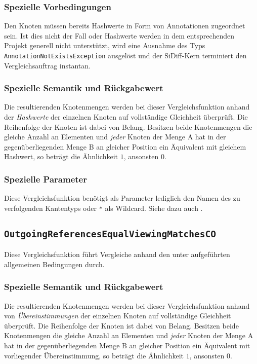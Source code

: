 \subsubsection*{Spezielle Vorbedingungen}
Den Knoten müssen bereits Hashwerte in Form von Annotationen zugeordnet sein. Ist dies nicht der Fall oder Hashwerte werden in dem entsprechenden Projekt generell nicht unterstützt, wird eine Ausnahme des Typs \texttt{AnnotationNotExistsException} ausgelöst und der SiDiff-Kern terminiert den Vergleichsauftrag instantan.

\subsubsection*{Spezielle Semantik und Rückgabewert}
Die resultierenden Knotenmengen werden bei dieser Vergleichsfunktion anhand der \emph{Hashwerte} der einzelnen Knoten auf vollständige Gleichheit überprüft. Die Reihenfolge der Knoten ist dabei von Belang. Besitzen beide Knotenmengen die gleiche Anzahl an Elementen und \emph{jeder} Knoten der Menge A hat in der gegenüberliegenden Menge B an gleicher Position ein Äquivalent mit gleichem Hashwert, so beträgt die Ähnlichkeit $1$, ansonsten $0$.

\subsubsection*{Spezielle Parameter}
Diese Vergleichsfunktion benötigt als Parameter lediglich den Namen des zu verfolgenden Kantentyps oder \texttt{*} als Wildcard. Siehe dazu auch .


%
%
\subsection{\texttt{OutgoingReferencesEqualViewingMatchesCO}}
Diese Vergleichsfunktion führt Vergleiche anhand den unter\mylinebreak{} aufgeführten allgemeinen Bedingungen durch.

\subsubsection*{Spezielle Semantik und Rückgabewert}
Die resultierenden Knotenmengen werden bei dieser Vergleichsfunktion anhand von \emph{Übereinstimmungen} der einzelnen Knoten auf vollständige Gleichheit überprüft. Die Reihenfolge der Knoten ist dabei von Belang. Besitzen beide Knotenmengen die gleiche Anzahl an Elementen und \emph{jeder} Knoten der Menge A hat in der gegenüberliegenden Menge B an gleicher Position ein Äquivalent mit vorliegender Übereinstimmung, so beträgt die Ähnlichkeit $1$, ansonsten $0$.

